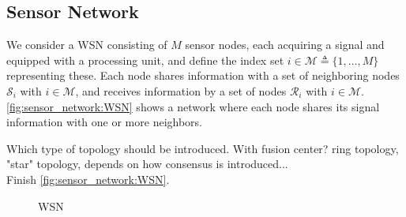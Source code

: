 \documentclass{article}
\newcommand{\hf}{{\bm{h}}}
\newcommand{\wf}{{\bm{w}}}
\newcommand{\Mset}{\mathcal{M}}
\newcommand{\Sset}{\mathcal{S}}
\newcommand{\Rset}{\mathcal{R}}
\begin{document}
\subsection{Sensor Network}
\label{ssec:sensor_network}
We consider a WSN consisting of \(M\) sensor nodes, each acquiring a signal and equipped with a processing unit, and define the index set  \(i \in \Mset \triangleq \{1,\ldots,M\} \) representing these.
Each node shares information with a set of neighboring nodes \(\Sset_i\) with \(i \in \Mset\), and receives information by a set of nodes \(\Rset_i\) with \(i \in \Mset\).
\autoref{fig:sensor_network:WSN} shows a network where each node shares its signal information with one or more neighbors.
\begin{todo}
    Which type of topology should be introduced. With fusion center? ring topology, "star" topology, depends on how consensus is introduced...\\
    Finish \autoref{fig:sensor_network:WSN}.
\end{todo}
\begin{figure}
    \centering
    
    \caption{WSN}
    \label{fig:sensor_network:WSN}
\end{figure}
\end{document}
